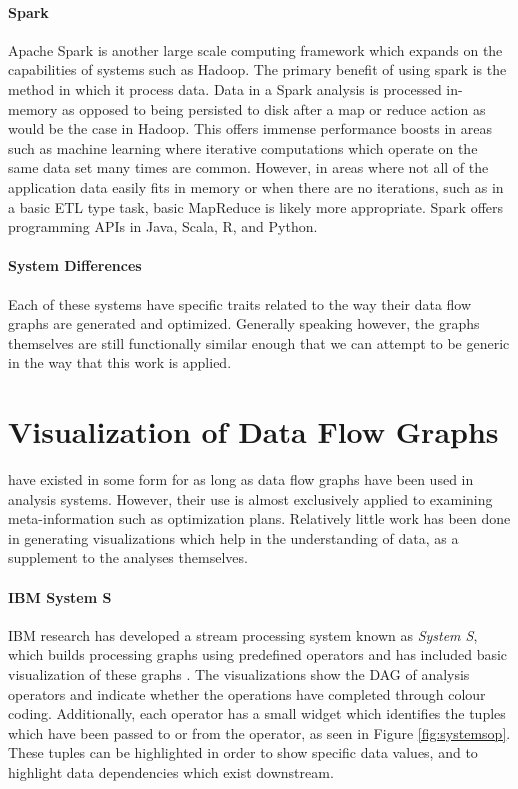 \paragraph{Spark}
Apache Spark \citep{Spark2015} is another large scale computing framework which expands on the capabilities of systems such as Hadoop. The primary benefit of using spark is the method in which it process data. Data in a Spark analysis is processed in-memory as opposed to being persisted to disk after a map or reduce action as would be the case in Hadoop. This offers immense performance boosts in areas such as machine learning where iterative computations which operate on the same data set many times are common. However, in areas where not all of the application data easily fits in memory or when there are no iterations, such as in a basic ETL type task, basic MapReduce is likely more appropriate.  Spark offers programming APIs in Java, Scala, R, and Python.

\paragraph{System Differences}
Each of these systems have specific traits related to the way their data flow graphs are generated and optimized. Generally speaking however, the graphs themselves are still functionally similar enough that we can attempt to be generic in the way that this work is applied. 

\section{Visualization of Data Flow Graphs}
\label{sec:dfgviz}

 have existed in some form for as long as data flow graphs have been used in analysis systems. However, their use is almost exclusively applied to examining meta-information such as optimization plans. Relatively little work has been done in generating visualizations which help in the understanding of data, as a supplement to the analyses themselves.

\paragraph{IBM System S}
IBM research has developed a stream processing system known as \emph{System S}, which builds processing graphs using predefined operators \citep{Gedik2008} and has included basic visualization of these graphs \cite{Pauw2010}. The visualizations show the DAG of analysis operators and indicate whether the operations have completed through colour coding. Additionally, each operator has a small widget which identifies the tuples which have been passed to or from the operator, as seen in Figure \ref{fig:systemsop}. These tuples can be highlighted in order to show specific data values, and to highlight data dependencies which exist downstream.

